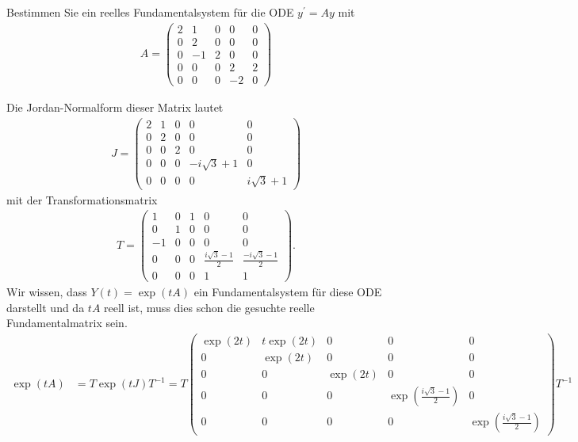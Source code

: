 \begin{exercise}
Bestimmen Sie ein reelles Fundamentalsystem für die ODE $y^{\prime}
= Ay$ mit
\begin{align*}
  A = \begin{pmatrix}
    2 & 1 & 0 & 0 & 0 \\
    0 & 2 & 0 & 0 & 0 \\
    0 & -1 & 2 & 0 & 0 \\
    0 & 0 & 0 & 2 & 2 \\
    0 & 0 & 0 & -2 & 0
  \end{pmatrix}
\end{align*}
\end{exercise}
\begin{solution}
Die Jordan-Normalform dieser Matrix lautet
\begin{align*}
J = \begin{pmatrix}
  2 & 1 & 0 & 0 & 0 \\
  0 & 2 & 0 & 0 & 0 \\
  0 & 0 & 2 & 0 & 0 \\
  0 & 0 & 0 & -i\sqrt{3} + 1  & 0 \\
  0 & 0 & 0 & 0 & i\sqrt{3} + 1
\end{pmatrix}
\end{align*}
mit der Transformationsmatrix
\begin{align*}
T =
\begin{pmatrix}
  1 & 0 & 1 & 0 & 0 \\
  0 & 1 & 0 & 0 & 0 \\
  -1 & 0 & 0 & 0 & 0 \\
  0 & 0 & 0 & \frac{i\sqrt{3} - 1}{2}  & \frac{-i\sqrt{3} - 1}{2} \\
  0 & 0 & 0 & 1 & 1
\end{pmatrix}.
\end{align*}
Wir wissen, dass $Y(t) = \exp(tA)$ ein Fundamentalsystem für diese ODE darstellt
und da $tA$ reell ist, muss dies schon die gesuchte reelle Fundamentalmatrix sein.
\begin{align*}
  \exp(tA) &= T\exp(tJ)T^{-1}
  = T\begin{pmatrix}
    \exp(2t) & t\exp(2t) & 0 & 0 & 0 \\
    0 & \exp(2t) & 0 & 0 & 0 \\
    0 & 0 & \exp(2t) & 0 & 0 \\
    0 & 0 & 0 & \exp(\frac{i\sqrt{3} - 1}{2}) & 0 \\
    0 & 0 & 0 & 0 & \exp(\frac{i\sqrt{3} - 1}{2})
  \end{pmatrix}T^{-1} \\

\end{align*}
\end{solution}
